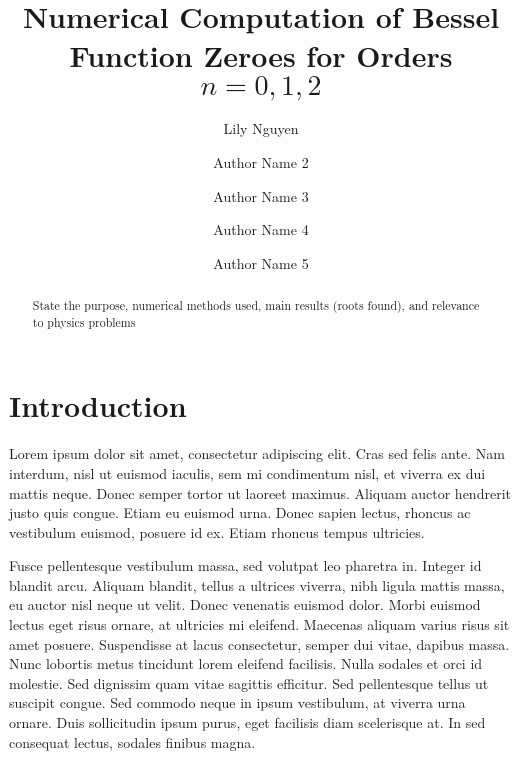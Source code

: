 \documentclass[linenumbers,RNAAS,trackchanges]{aastex631}
\begin{document}
\title{Numerical Computation of Bessel Function Zeroes for Orders $n=0,1,2$}
\author{Lily Nguyen}

\author[0000-0000-0000-0000]{Author Name 2}


\author[0000-0000-0000-0000]{Author Name 3}
\author[0000-0000-0000-0000]{Author Name 4}
\author[0000-0000-0000-0000]{Author Name 5}

\begin{abstract}
State the purpose, numerical methods used, main results (roots found), and relevance to physics problems
\end{abstract}

\section{Introduction} \label{sec:intro}
Lorem ipsum dolor sit amet, consectetur adipiscing elit. Cras sed felis ante. Nam interdum, nisl ut euismod iaculis, sem mi condimentum nisl, et viverra ex dui mattis neque. Donec semper tortor ut laoreet maximus. Aliquam auctor hendrerit justo quis congue. Etiam eu euismod urna. Donec sapien lectus, rhoncus ac vestibulum euismod, posuere id ex. Etiam rhoncus tempus ultricies.

Fusce pellentesque vestibulum massa, sed volutpat leo pharetra in. Integer id blandit arcu. Aliquam blandit, tellus a ultrices viverra, nibh ligula mattis massa, eu auctor nisl neque ut velit. Donec venenatis euismod dolor. Morbi euismod lectus eget risus ornare, at ultricies mi eleifend. Maecenas aliquam varius risus sit amet posuere. Suspendisse at lacus consectetur, semper dui vitae, dapibus massa. Nunc lobortis metus tincidunt lorem eleifend facilisis. Nulla sodales et orci id molestie. Sed dignissim quam vitae sagittis efficitur. Sed pellentesque tellus ut suscipit congue. Sed commodo neque in ipsum vestibulum, at viverra urna ornare. Duis sollicitudin ipsum purus, eget facilisis diam scelerisque at. In sed consequat lectus, sodales finibus magna.
\end{document}
